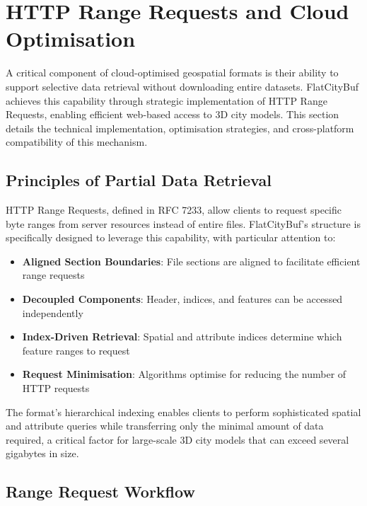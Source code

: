 
\section{HTTP Range Requests and Cloud Optimisation}
\label{methodology:http_range_requests}

A critical component of cloud-optimised geospatial formats is their ability to support selective data retrieval without downloading entire datasets. FlatCityBuf achieves this capability through strategic implementation of HTTP Range Requests, enabling efficient web-based access to 3D city models. This section details the technical implementation, optimisation strategies, and cross-platform compatibility of this mechanism.

\subsection{Principles of Partial Data Retrieval}
\label{methodology:http_range_requests:partial_retrieval_principles}

HTTP Range Requests, defined in RFC 7233, allow clients to request specific byte ranges from server resources instead of entire files. FlatCityBuf's structure is specifically designed to leverage this capability, with particular attention to:

\begin{itemize}
    \item \textbf{Aligned Section Boundaries}: File sections are aligned to facilitate efficient range requests
    \item \textbf{Decoupled Components}: Header, indices, and features can be accessed independently
    \item \textbf{Index-Driven Retrieval}: Spatial and attribute indices determine which feature ranges to request
    \item \textbf{Request Minimisation}: Algorithms optimise for reducing the number of HTTP requests
\end{itemize}

The format's hierarchical indexing enables clients to perform sophisticated spatial and attribute queries while transferring only the minimal amount of data required, a critical factor for large-scale 3D city models that can exceed several gigabytes in size.

\subsection{Range Request Workflow}
\label{methodology:http_range_requests:range_request_workflow}

